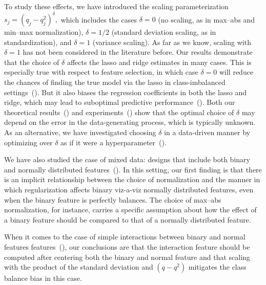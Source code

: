 To study these effects, we have introduced the scaling parameterization $s_j = (q_j -
  q_j^2)^\delta,$ which includes the cases \(\delta=0\) (no scaling, as in max--abs and
min--max normalization), \(\delta = 1/2\) (standard deviation scaling, as in
standardization), and \(\delta=1\) (variance scaling). As far as we know, scaling with
\(\delta=1\) has not been considered in the literature before. Our results demonstrate that
the choice of \(\delta\) affects the lasso and ridge estimates in many cases. This is
especially true with respect to feature selection, in which case \(\delta=0\) will reduce
the chances of finding the true model via the lasso in class-imbalanced
settings~(). But it also biases the regression coefficients
in both the lasso and ridge, which may lead to suboptimal predictive
performance~(). Both our theoretical
results~() and
experiments~() show that the optimal choice of \(\delta\) may
depend on the error in the data-generating process, which is typically unknown. As an
alternative, we have investigated choosing \(\delta\) in a data-driven manner by optimizing
over \(\delta\) as if it were a hyperparameter~().

We have also studied the case of mixed data: designs that include both binary and normally
distributed features~(). In this setting, our first finding is that
there is an implicit relationship between the choice of normalization and the manner in
which regularization affects binary viz-a-viz normally distributed features, even when the
binary feature is perfectly balances. The choice of max--abs normalization, for instance,
carries a specific assumption about how the effect of a binary feature should be compared
to that of a normally distributed feature.

When it comes to the case of simple interactions between binary and normal features
features~(), our conclusions are that the interaction
feature should be computed after centering both the binary and normal feature and that
scaling with the product of the standard deviation and \((q-q^2)\) mitigates the class
balance bias in this case.

